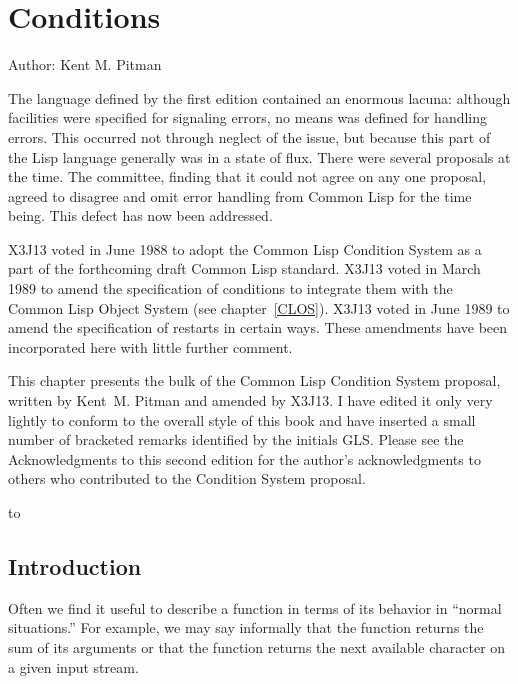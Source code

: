 
\clearpage\def\pagestatus{FINAL PROOF}


\def\SU#1{${}_{#1}$}

\chapter{Conditions}
\label{CONDITION}

Author: Kent M. Pitman
\prefaceword
\begin{new}
The language defined by the first edition contained an enormous lacuna:
although facilities were specified for signaling errors,
no means was defined for handling errors.  This occurred not through neglect
of the issue, but because this part of the Lisp language generally
was in a state of flux.  There were several proposals at the
time.  The committee, finding that it could not agree on any one proposal,
agreed to disagree and omit error handling from Common Lisp for the time being.
This defect has now been addressed.
\end{new}

X3J13 voted in June 1988
to adopt the Common Lisp Condition System
as a part of the forthcoming draft Common Lisp standard.
X3J13 voted in March 1989 
to amend the specification of conditions to integrate them
with the Common Lisp Object System (see chapter~\ref{CLOS}). 
X3J13 voted in June 1989  to amend the
specification of restarts in certain ways. These amendments have
been incorporated here with little further comment.

This chapter presents the bulk of the Common Lisp
Condition System proposal, written by Kent~M. Pitman
and amended by X3J13.  I have edited it only very lightly
to conform to the overall style of this book and have inserted a small
number of bracketed remarks identified by the initials GLS.
Please see the Acknowledgments to this second edition for the author's
acknowledgments to others who contributed to the Condition System proposal.

\noindent\hbox to \textwidth{\hss---Guy L. Steele Jr.}

\section{Introduction}

Often we find it useful to describe a function in terms of its behavior in
``normal situations.'' For example, we may say informally that the function
\cdf{+} returns the sum of its arguments or that the function
 returns the next available character on a given input
stream.

